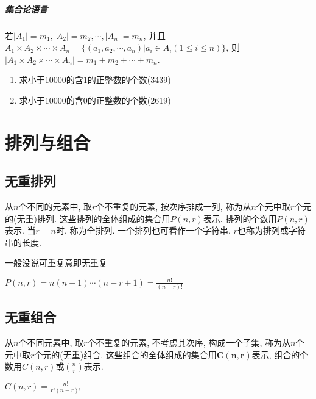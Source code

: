         \subparagraph{集合论语言}

            若$|A_1|=m_1, |A_2|=m_2, \cdots, |A_n|=m_n$, 并且$A_1\times A_2\times \cdots \times A_n=\{(a_1,a_2,\cdots,a_n)|a_i\in A_i(1\leqslant i\leqslant n)\}$, 则$|A_1\times A_2\times\cdots\times A_n|=m_1+m_2+\cdots+m_n$.

        \begin{example}
            \begin{enumerate}
                \item 求小于10000的含1的正整数的个数(3439)
                \item 求小于10000的含0的正整数的个数(2619)
            \end{enumerate}
        \end{example}

\section{排列与组合}

    \subsection{无重排列}

        \begin{definition}[无重排列]
            从$n$个不同的元素中, 取$r$个不重复的元素, 按次序排成一列, 称为从$n$个元中取$r$个元的\textsf{(无重)排列}. 这些排列的全体组成的集合用$P(n,r)$表示. 排列的个数用$P(n,r)$表示. 当$r=n$时, 称为\textsf{全排列}. 一个排列也可看作一个字符串, $r$也称为排列或字符串的长度. 
        \end{definition}

        \begin{caution}
            一般没说可重复意即无重复
        \end{caution}

        \begin{theorem}
            $P(n,r)=n(n-1)\cdots(n-r+1)=\frac{n!}{(n-r)!}$
        \end{theorem}

    \subsection{无重组合}

        \begin{definition}[无重组合]
            从$n$个不同元素中, 取$r$个不重复的元素, 不考虑其次序, 构成一个子集, 称为从$n$个元中取$r$个元的\textsf{(无重)组合}. 这些组合的全体组成的集合用$\mathbf{C(n,r)}$表示, 组合的个数用$C(n,r)$或$n\choose r$表示.
        \end{definition}
        \begin{theorem}
            $C(n,r)=\frac{n!}{r!(n-r)!}$
        \end{theorem}

